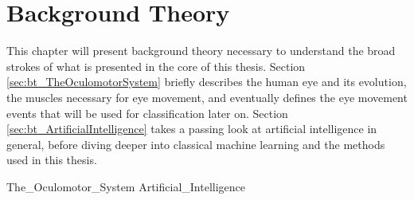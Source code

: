 \chapter{Background Theory} \label{ch:bt}

This chapter will present background theory necessary to understand the broad strokes of what is presented in the core of this thesis. Section \ref{sec:bt_TheOculomotorSystem} briefly describes the human eye and its evolution, the muscles necessary for eye movement, and eventually defines the eye movement events that will be used for classification later on. Section \ref{sec:bt_ArtificialIntelligence} takes a passing look at artificial intelligence in general, before diving deeper into classical machine learning and the methods used in this thesis.

{The_Oculomotor_System}
{Artificial_Intelligence}